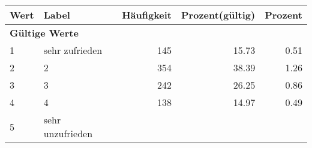      \begin{longtable}{lXrrr}
     \toprule
     \textbf{Wert} & \textbf{Label} & \textbf{Häufigkeit} & \textbf{Prozent(gültig)} & \textbf{Prozent} \\
     \endhead
     \midrule
     \multicolumn{5}{l}{\textbf{Gültige Werte}}\\

     1 &
     \multicolumn{1}{X}{ sehr zufrieden   } &


       \num{145} &
       \num[round-mode=places,round-precision=2]{15.73} &
         \num[round-mode=places,round-precision=2]{0.51} \\

     2 &
     \multicolumn{1}{X}{ 2   } &


       \num{354} &
       \num[round-mode=places,round-precision=2]{38.39} &
         \num[round-mode=places,round-precision=2]{1.26} \\

     3 &
     \multicolumn{1}{X}{ 3   } &


       \num{242} &
       \num[round-mode=places,round-precision=2]{26.25} &
         \num[round-mode=places,round-precision=2]{0.86} \\

     4 &
     \multicolumn{1}{X}{ 4   } &


       \num{138} &
       \num[round-mode=places,round-precision=2]{14.97} &
         \num[round-mode=places,round-precision=2]{0.49} \\

     5 &
     \multicolumn{1}{X}{ sehr unzufrieden   } &



\end{longtable}
